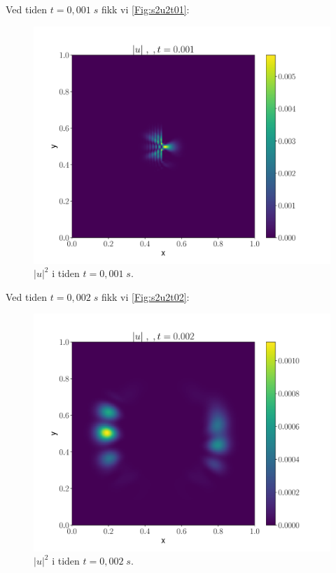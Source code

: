 \documentclass[reprint,english,notitlepage]{revtex4-2}  %
\begin{document}
Ved tiden $t = 0,001 \; s$ fikk vi \autoref{Fig:s2u2t01}:

\begin{figure}[H]
\centering
\includegraphics[scale=0.45, trim={3cm 0 0 0}]{../Images/ImshowUt0001.pdf}
\caption{$|u|^2 $ i tiden $t = 0,001 \; s$.}
\label{Fig:s2u2t01}
\end{figure}

Ved tiden $t = 0,002 \; s$ fikk vi \autoref{Fig:s2u2t02}:

\begin{figure}[H]
\centering
\includegraphics[scale=0.45, trim={0 0 0 0}]{../Images/ImshowUt0002.pdf}
\caption{$|u|^2 $ i tiden $t = 0,002 \; s$.}
\label{Fig:s2u2t02}
\end{figure}
\end{document}

